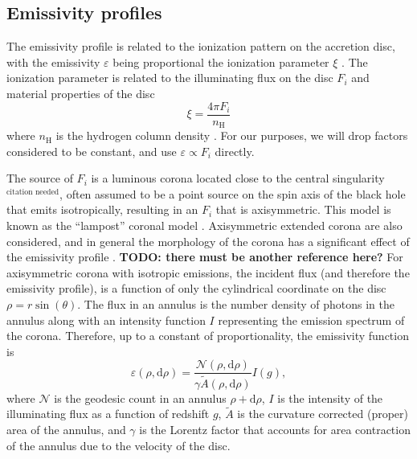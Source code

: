 \documentclass[fleqn,usenatbib]{mnras}
\newcommand{\citneeded}{{\bf \color{red} $^{\text{citation needed}}$}}
\newcommand{\todo}[1]{{\noindent \bf \color{red} TODO: #1}}
\renewcommand{\d}{\text{d}}
\begin{document}
\subsection{Emissivity profiles}
\label{sec:emissivity-profiles}

The emissivity profile is related to the ionization pattern on the accretion
disc, with the emissivity $\varepsilon$ being proportional the ionization
parameter $\xi$ \citep{laor_line_1991,wilkins_understanding_2012}. The
ionization parameter is related to the illuminating flux on the disc $F_i$ and
material properties of the disc
\begin{equation}
    \xi = \frac{4 \pi F_i}{n_\text{H}}
\end{equation}
where $n_\text{H}$ is the hydrogen column density \citep{ross_effects_1993}. For
our purposes, we will drop factors considered to be constant, and use
$\varepsilon \propto F_i$ directly.

The source of $F_i$ is a luminous corona located close to the central
singularity\citneeded, often assumed to be a point source on the
spin axis of the black hole that emits isotropically, resulting in an $F_i$
that is axisymmetric. This model is known as the ``lampost'' coronal model
\citep{fukumura_accretion_2007}. Axisymmetric extended corona are also
considered, and in general the morphology of the corona has a
significant effect of the emissivity profile \citep{gonzalez_probing_2017}.
\todo{there must be another reference here?} For axisymmetric corona with
isotropic emissions, the incident flux (and therefore the emissivity profile), is a function
of only the cylindrical coordinate on the disc $\rho = r \sin(\theta)$. The flux
in an annulus is the number density of photons in the annulus along with an
intensity function $I$ representing the emission spectrum of the corona.
Therefore, up to a constant of proportionality,
the emissivity function is
\begin{equation}
    \varepsilon (\rho, \d \rho) = \frac{\mathcal{N}(\rho, \d \rho)}{\gamma
    \tilde{A}(\rho, \d \rho)} I(g),
\end{equation}
where $\mathcal{N}$ is the geodesic count in an annulus $\rho + \d \rho$, $I$ is
the intensity of the illuminating flux as a function of redshift $g$,
$\tilde{A}$ is the curvature corrected (proper) area of the annulus, and
$\gamma$ is the Lorentz factor that accounts for area contraction of the annulus
due to the velocity of the disc.
\end{document}
